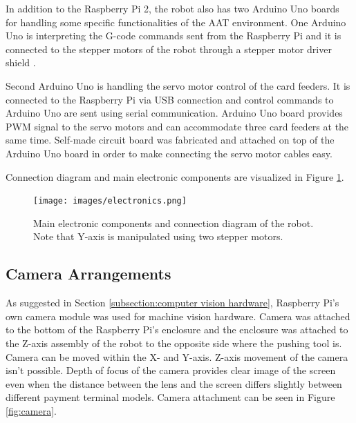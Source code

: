 In addition to the Raspberry Pi 2, the robot also has two Arduino Uno boards for handling some specific functionalities of the AAT environment. One Arduino Uno is interpreting the G-code commands sent from the Raspberry Pi and it is connected to the stepper motors of the robot through a stepper motor driver shield \emph{\citep{grbl_shield}}.

Second Arduino Uno is handling the servo motor control of the card feeders. It is connected to the Raspberry Pi via USB connection and control commands to Arduino Uno are sent using serial communication. Arduino Uno board provides PWM signal to the servo motors and can accommodate three card feeders at the same time. Self-made circuit board was fabricated and attached on top of the Arduino Uno board in order to make connecting the servo motor cables easy.

Connection diagram and main electronic components are visualized in Figure \ref{fig:electronics}.

\begin{figure}[ht]
  \begin{center}
    \texttt{[image: images/electronics.png]}
    \caption{Main electronic components and connection diagram of the robot. Note that Y-axis is manipulated using two stepper motors.}
    \label{fig:electronics}
  \end{center}
\end{figure}
\FloatBarrier

\subsection{Camera Arrangements}
\label{subsection:Camera Arrangements}

As suggested in Section \ref{subsection:computer vision hardware}, Raspberry Pi's own camera module was used for machine vision hardware. Camera was attached to the bottom of the Raspberry Pi's enclosure and the enclosure was attached to the Z-axis assembly of the robot to the opposite side where the pushing tool is. Camera can be moved within the X- and Y-axis. Z-axis movement of the camera isn't possible. Depth of focus of the camera provides clear image of the screen even when the distance between the lens and the screen differs slightly between different payment terminal models. Camera attachment can be seen in Figure \ref{fig:camera}.

